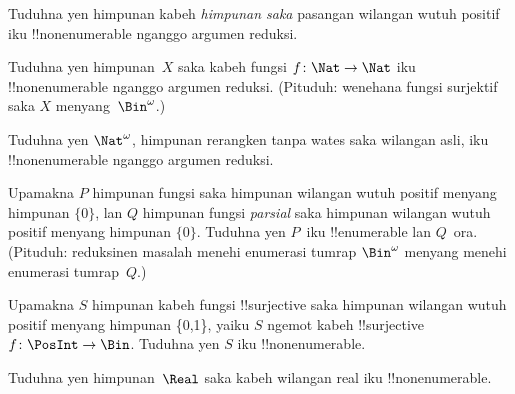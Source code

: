 \documentclass[../../../include/open-logic-section]{subfiles}
\begin{document}
\begin{prob}
Tuduhna yen himpunan kabeh \emph{himpunan saka} pasangan wilangan wutuh positif
iku !!{nonenumerable} nganggo argumen reduksi.
\end{prob}

\begin{prob}\label{sfr:siz:red:prob:nat-nat}
  Tuduhna yen himpunan~$X$ saka kabeh fungsi $f\colon \Nat \to \Nat$
  iku !!{nonenumerable} nganggo argumen reduksi. (Pituduh: wenehana fungsi
  surjektif saka $X$ menyang~$\Bin^\omega$.)
\end{prob}

\begin{prob}
Tuduhna yen $\Nat^\omega$, himpunan rerangken tanpa wates saka
wilangan asli, iku !!{nonenumerable} nganggo argumen reduksi.
\end{prob}

\begin{prob}
Upamakna $P$ himpunan fungsi saka himpunan wilangan wutuh positif
menyang himpunan $\{0\}$, lan $Q$ himpunan fungsi \emph{parsial}
saka himpunan wilangan wutuh positif menyang himpunan $\{0\}$.
Tuduhna yen $P$~iku !!{enumerable} lan $Q$~ora. (Pituduh: reduksinen
  masalah menehi enumerasi tumrap $\Bin^\omega$ menyang menehi enumerasi tumrap~$Q$.)
\end{prob}

\begin{prob}
Upamakna $S$ himpunan kabeh fungsi !!{surjective} saka himpunan
wilangan wutuh positif menyang himpunan \{0,1\}, yaiku $S$ ngemot kabeh
!!{surjective}~$f\colon \PosInt \to \Bin$. Tuduhna yen $S$ iku
!!{nonenumerable}.
\end{prob}

\begin{prob}
Tuduhna yen himpunan~$\Real$ saka kabeh wilangan real iku !!{nonenumerable}.
\end{prob}
\end{document}
